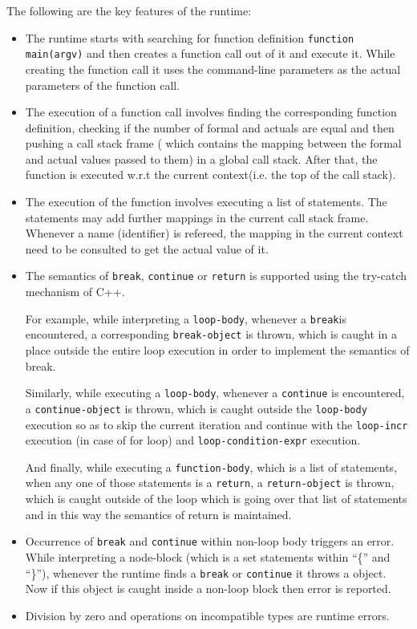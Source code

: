 The following are the key features of the runtime:
\begin{itemize}
  \item The runtime starts with searching for function definition
  {\tt function main(argv)} and then creates a function call out of it and 
  execute it.  While creating the function call it uses the command-line 
  parameters as the actual parameters of the function call.

  \item The execution of a function call involves finding the corresponding 
  function definition, checking if the number of formal and actuals are equal 
  and then pushing a call stack frame ( which contains the mapping between the 
      formal and actual values passed to them) in a global call stack. After 
  that, the function
  is executed w.r.t the current context(i.e. the top of the call stack).

  \item The execution of the function involves executing a list of statements.
  The statements may add further mappings in the current call stack frame.
  Whenever a name (identifier) is refereed, the mapping in the current context 
  need to be consulted to get the actual value of it. 

  \item The semantics of {\tt break}, {\tt continue} or 
{\tt return} is supported using the try-catch mechanism of C++.

  For example, while interpreting a {\tt loop-body}, whenever a 
{\tt break}is encountered, a corresponding {\tt break-object} is 
thrown, which is caught in a place outside the entire loop execution in order to 
implement the semantics of break. 

  Similarly, while executing a {\tt loop-body}, whenever a 
{\tt continue} is encountered, a {\tt continue-object} is thrown, 
  which is caught outside
  the {\tt loop-body} execution so as to skip the current iteration and 
  continue with the {\tt loop-incr} execution (in case of for loop) and 
{\tt loop-condition-expr} execution.

  And finally, while executing a  {\tt function-body}, which is a list
  of statements, when any one of those statements is a {\tt return}, a 
{\tt return-object} is thrown, which is caught outside of the loop
  which is going over that list of statements and in this way the semantics of return is 
  maintained.
  
  \item Occurrence of {\tt break} and {\tt continue} within non-loop
    body triggers an error. While interpreting a node-block (which is a set 
        statements within ``\{'' and ``\}''), whenever the runtime finds a 
{\tt break} or  {\tt continue} it throws a object. Now if this 
object is caught
  inside a non-loop block then error is reported.

  \item Division by zero and operations on incompatible types are runtime 
  errors.  
  
  \end{itemize}

